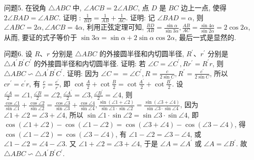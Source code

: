 问题5. 在锐角 $\triangle A B C$ 中, $\angle A C B=2 \angle A B C$, 点 $D$ 是 $B C$ 边上一点, 使得 $2 \angle B A D=\angle A B C$. 证明 : $\frac{1}{B D}=\frac{1}{A B}+\frac{1}{A C}$.
证明: 记 $\angle B A D=\alpha$, 则 $\angle A B C=2 \alpha, \angle A C B=4 \alpha$, 利用正弦定理可知, $\frac{B D}{A B}=\frac{\sin \alpha}{\sin 3 \alpha}, \frac{A B}{A C}=\frac{\sin 4 \alpha}{\sin 2 \alpha}=2 \cos 2 \alpha$, 从而, 要证的式子等价于 $\sin 3 \alpha= \sin \alpha+2 \sin \alpha \cos 2 \alpha$, 最后一式是显然的.



问题6. 设 $R 、 r$ 分别是 $\triangle A B C$ 的外接圆半径和内切圆半径, $R^{\prime} 、 r^{\prime}$ 分别是 $\triangle A^{\prime} B^{\prime} C^{\prime}$ 的外接圆半径和内切圆半径.
证明: 若 $\angle C=\angle C^{\prime}, R r^{\prime}=R^{\prime} r$, 则 $\triangle A B C \backsim \triangle A^{\prime} B^{\prime} C^{\prime}$.
证明: 因为 $\angle C==\angle C^{\prime}, R=\frac{c}{2 \sin C}, R^{\prime}=\frac{c^{\prime}}{2 \sin C}$, 所以 $c r^{\prime}=c^{\prime} r$, 有 $\frac{c}{r}=\frac{c^{\prime}}{r^{\prime}}$, 即 $\cot \frac{A}{2}+\cot \frac{B}{2}=\cot \frac{A^{\prime}}{2}+\cot \frac{B^{\prime}}{2}$.
设 $\frac{\angle A}{2}=\angle 1, \frac{\angle B}{2}=\angle 2, \frac{\angle A^{\prime}}{2}=\angle 3, \frac{\angle B^{\prime}}{2}=\angle 4$, 则 $\frac{\cos \angle 1}{\sin \angle 1}+\frac{\cos \angle 2}{\sin \angle 2}= \frac{\cos \angle 3}{\sin \angle 3}+\frac{\cos \angle 4}{\sin \angle 4}, \frac{\sin (\angle 1+\angle 2)}{\sin \angle 1 \cdot \sin \angle 2}=\frac{\sin (\angle 3+\angle 4)}{\sin \angle 3 \cdot \sin \angle 4}$, 因为 $\angle 1+\angle 2=\angle 3+ \angle 4$, 所以 $\sin \angle 1 \cdot \sin \angle 2=\sin \angle 3 \cdot \sin \angle 4$, 即 $\cos (\angle 1+\angle 2)-\cos (\angle 1- \angle 2)=\cos (\angle 3+\angle 4)-\cos (\angle 3-\angle 4)$, 得 $\cos (\angle 1-\angle 2)=\cos (\angle 3- \angle 4)$, 有 $\angle 1-\angle 2=\angle 3-\angle 4$, 或 $\angle 1-\angle 2=\angle 4-\angle 3$. 又 $\angle 1+\angle 2= \angle 3+\angle 4$, 于是 $\angle A=\angle A^{\prime}$ 或 $\angle A=\angle B^{\prime}$.
故 $\triangle A B C \backsim \triangle A^{\prime} B^{\prime} C^{\prime}$.



